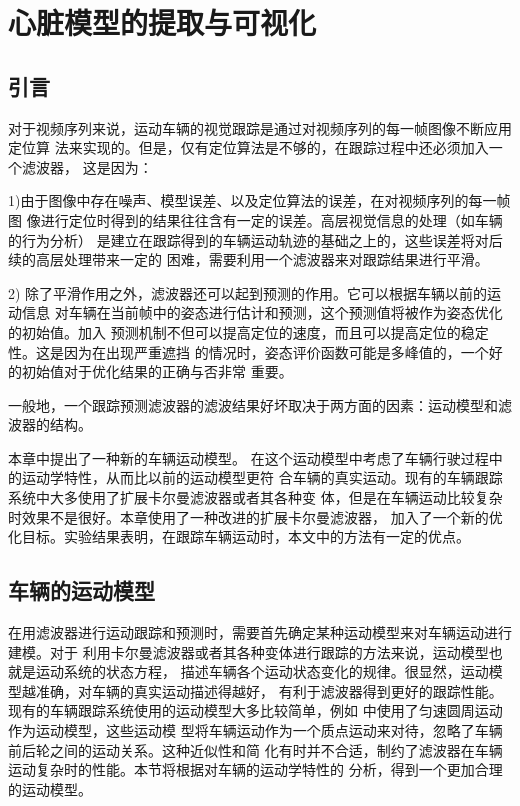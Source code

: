 \chapter{心脏模型的提取与可视化}
\label{chap5}
\section{引言}
对于视频序列来说，运动车辆的视觉跟踪是通过对视频序列的每一帧图像不断应用定位算
法来实现的。但是，仅有定位算法是不够的，在跟踪过程中还必须加入一个滤波器，
这是因为：

1)由于图像中存在噪声、模型误差、以及定位算法的误差，在对视频序列的每一帧图
像进行定位时得到的结果往往含有一定的误差。高层视觉信息的处理（如车辆的行为分析）
是建立在跟踪得到的车辆运动轨迹的基础之上的，这些误差将对后续的高层处理带来一定的
困难，需要利用一个滤波器来对跟踪结果进行平滑。

2) 除了平滑作用之外，滤波器还可以起到预测的作用。它可以根据车辆以前的运动信息
对车辆在当前帧中的姿态进行估计和预测，这个预测值将被作为姿态优化的初始值。加入
预测机制不但可以提高定位的速度，而且可以提高定位的稳定性。这是因为在出现严重遮挡
的情况时，姿态评价函数可能是多峰值的，一个好的初始值对于优化结果的正确与否非常
重要。

一般地，一个跟踪预测滤波器的滤波结果好坏取决于两方面的因素：运动模型和滤波器的结构。

本章中提出了一种新的车辆运动模型。
在这个运动模型中考虑了车辆行驶过程中的运动学特性，从而比以前的运动模型更符
合车辆的真实运动。现有的车辆跟踪系统中大多使用了扩展卡尔曼滤波器或者其各种变
体，但是在车辆运动比较复杂时效果不是很好。本章使用了一种改进的扩展卡尔曼滤波器，
加入了一个新的优化目标。实验结果表明，在跟踪车辆运动时，本文中的方法有一定的优点。

\section{车辆的运动模型}
在用滤波器进行运动跟踪和预测时，需要首先确定某种运动模型来对车辆运动进行建模。对于
利用卡尔曼滤波器或者其各种变体进行跟踪的方法来说，运动模型也就是运动系统的状态方程，
描述车辆各个运动状态变化的规律。很显然，运动模型越准确，对车辆的真实运动描述得越好，
有利于滤波器得到更好的跟踪性能。现有的车辆跟踪系统使用的运动模型大多比较简单，例如
\cite{Koller:1993}\cite{Maybank:1996}中使用了匀速圆周运动作为运动模型，这些运动模
型将车辆运动作为一个质点运动来对待，忽略了车辆前后轮之间的运动关系。这种近似性和简
化有时并不合适，制约了滤波器在车辆运动复杂时的性能。本节将根据对车辆的运动学特性的
分析，得到一个更加合理的运动模型。
